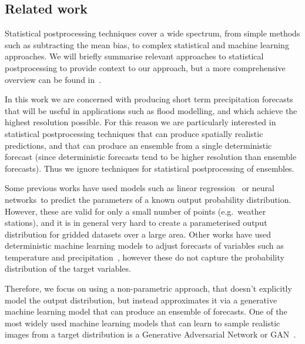 \documentclass{article}
\begin{document}
\subsection{Related work}

Statistical postprocessing techniques cover a wide spectrum, from simple methods such as subtracting the mean bias, to complex statistical and machine learning approaches. We will briefly summarise relevant approaches to statistical postprocessing to provide context to our approach, but a more comprehensive overview can be found in~\cite{vannitsem_statistical_2021}. 

In this work we are concerned with producing short term precipitation forecasts that will be useful in applications such as flood modelling, and which achieve the highest resolution possible. For this reason we are particularly interested in statistical postprocessing techniques that can produce spatially realistic predictions, and that can produce an ensemble from a single deterministic forecast (since deterministic forecasts tend to be higher resolution than ensemble forecasts). Thus we ignore techniques for statistical postprocessing of ensembles.

Some previous works have used models such as linear regression~\citep{gneiting_calibrated_2005} or neural networks~\citep{rasp_neural_2018}to predict the parameters of a known output probability distribution. However, these are valid for only a small number of points (e.g.~weather stations), and it is in general very hard to create a parameterised output distribution for gridded datasets over a large area. Other works have used deterministic machine learning models to adjust forecasts of variables such as temperature and precipitation~\citep{gronquist_deep_2021, han_deep_2021, horat_deep_2023}, however these do not capture the probability distribution of the target variables. 

Therefore, we focus on using a non-parametric approach, that doesn't explicitly model the output distribution, but instead approximates it via a generative machine learning model that can produce an ensemble of forecasts. One of the most widely used machine learning models that can learn to sample realistic images from a target distribution is a Generative Adversarial Network or GAN~\citep{goodfellow_generative_2014}. 
\end{document}
